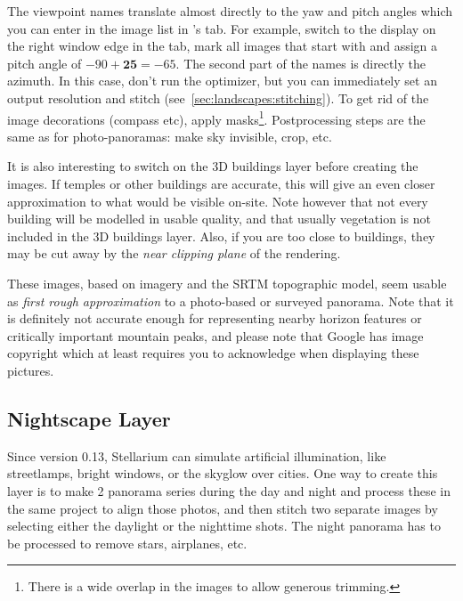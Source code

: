 The viewpoint names translate almost directly to the yaw and pitch
angles which you can enter in the image list in 's
 tab. For example, switch to the  display
on the right window edge in the  tab, mark all images that
start with  and assign a pitch angle of
$-90+\mathbf{25}=-65$. The second part of the names is directly the
azimuth.  In this case, don't run the optimizer, but you can
immediately set an output resolution and stitch
(see~\ref{sec:landscapes:stitching}). To get rid of the image
decorations (compass etc), apply masks\footnote{There is a wide
  overlap in the images to allow generous trimming.}. Postprocessing
steps are the same as for photo-panoramas: make sky invisible, crop,
etc.

It is also interesting to switch on the 3D buildings layer before
creating the images. If temples or other buildings are accurate, this
will give an even closer approximation to what would be visible
on-site. Note however that not every building will be modelled in
usable quality, and that usually vegetation is not included in the 3D
buildings layer. Also, if you are too close to buildings, they may be
cut away by the \emph{near clipping plane} of the rendering.

These images, based on  imagery and the SRTM
topographic model, seem usable as \emph{first rough approximation} to
a photo-based or surveyed panorama. Note that it is definitely not
accurate enough for representing nearby horizon features or critically
important mountain peaks, and please note that Google has image
copyright which at least requires you to acknowledge when displaying
these pictures.

\subsection{Nightscape Layer}
\label{sec:landscapes:landscapes:Nightscape}

Since version 0.13, Stellarium can simulate artificial illumination,
like streetlamps, bright windows, or the skyglow over cities. One way to
create this layer is to make 2 panorama series during the day and night
and process these in the same  project to align those photos,
and then stitch two separate images by selecting either the daylight or the
nighttime shots. The night panorama has to be processed to remove
stars, airplanes, etc.

